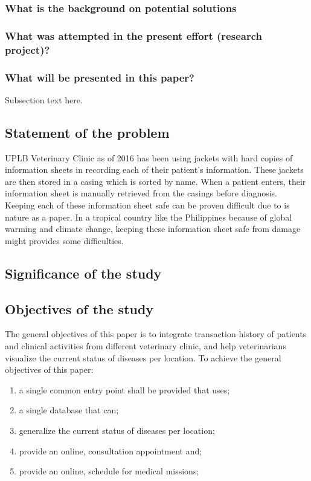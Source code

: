 \documentclass[journal]{./IEEE/IEEEtran}
\begin{document}
\subsubsection*{What is the background on potential solutions}

\subsubsection*{What was attempted in the present effort (research project)?}

\subsubsection*{What will be presented in this paper?}
Subsection text here.

\subsection{Statement of the problem}
UPLB Veterinary Clinic as of 2016 has been using jackets with hard copies of information sheets in recording each of their patient's information. These jackets are then stored in a casing which is sorted by name. When a patient enters, their information sheet is manually retrieved from the casings before diagnosis. Keeping each of these information sheet safe can be proven difficult due to is nature as a paper. In a tropical country like the Philippines because of global warming and climate change, keeping these information sheet safe from damage might provides some difficulties.

\subsection{Significance of the study}

\subsection{Objectives of the study}
The general objectives of this paper is to integrate transaction history of patients and clinical activities from different veterinary clinic, and help veterinarians visualize the current status of diseases per location. To achieve the general objectives of this paper: 
\begin{enumerate}
\item a single common entry point shall be provided that uses;
\item a single database that can;
\item generalize the current status of diseases per location;
\item provide an online, consultation appointment and;
\item provide an online, schedule for medical missions;
\end{enumerate}
\end{document}
